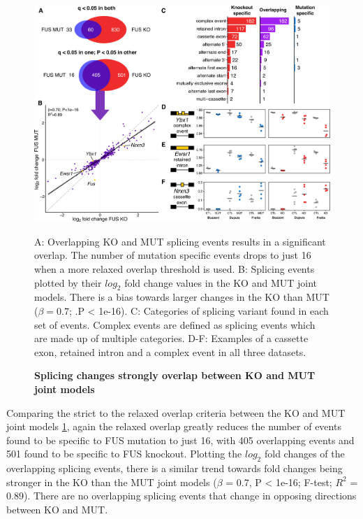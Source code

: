 \begin{figure}[h!]
	\centering
	\includegraphics[width=\textwidth]{Figures/06_fus_meta/splicing_multi.png}
	\caption{\textbf{Splicing changes  strongly overlap between KO and MUT joint models}}
	A: Overlapping KO and MUT splicing events results in a significant overlap. The number of mutation specific events drops to just 16 when a more relaxed overlap threshold is used.
	B: Splicing events plotted by their $log_2$ fold change values in the KO and MUT joint models. There is a bias towards larger changes in the KO than MUT ($\beta = 0.7$; .P < 1e-16).
	C: Categories of splicing variant found in each set of events. Complex events are defined as splicing events which are made up of multiple categories.
	D-F: Examples of a cassette exon, retained intron and a complex event in all three datasets. 
	\label{fig:fus_splicing_multi}
\end{figure}

Comparing the strict to the relaxed overlap criteria between the KO and MUT joint models \ref{fig:fus_splicing_multi}, again the relaxed overlap greatly reduces the number of events found to be specific to FUS mutation to just 16, with 405 overlapping events and 501 found to be specific to FUS knockout. 
Plotting the $log_2$ fold changes of the overlapping splicing events, there is a similar trend towards fold changes being stronger in the KO than the MUT joint models ($\beta$ = 0.7, P < 1e-16; F-test; $R^2$ = 0.89). 
There are no overlapping splicing events that change in opposing directions between KO and MUT.

